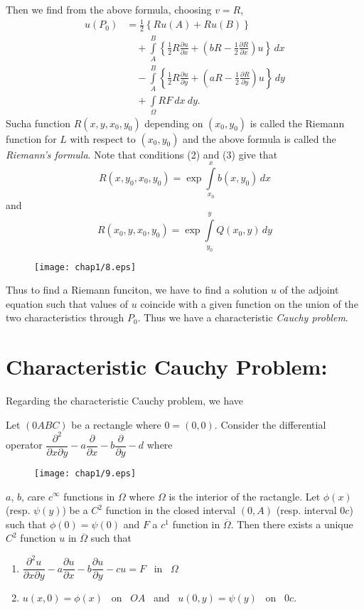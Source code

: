 Then we find from the above formula, choosing $v=R$,
\begin{align*}
u(P_{0}) &= \frac{1}{2}\left\{Ru(A)+Ru(B)\right\}\\[3pt]
         &\quad + \int\limits^{B}_{A}\left\{\frac{1}{2}R\frac{\partial u}{\partial x}+\left(bR-\frac{1}{2}\frac{\partial R}{\partial x}\right)u\right\}\,dx\\[3pt]
&\quad - \int\limits^{B}_{A}\left\{\frac{1}{2}R\frac{\partial u}{\partial y}+\left(aR-\frac{1}{2}\frac{\partial R}{\partial y}\right)u\right\}\,dy\\[3pt]
&\quad + \int\limits_{\Omega} RF \ dx \ dy.
\end{align*}
Such\pageoriginale a function $R(x,y,x_{0},y_{0})$ depending on $(x_{0},y_{0})$ is called the Riemann function for $L$ with respect to $(x_{0},y_{0})$ and the above formula is called the {\em Riemann's formula}. Note that conditions (2) and (3) give that
$$
R(x,y_{0},x_{0},y_{0})=\exp \int\limits^{x}_{x_{0}}b(x,y_{0})\,dx
$$
and
$$
R(x_{0},y,x_{0},y_{0})=\exp \int\limits^{y}_{y_{0}}Q(x_{0},y)\,dy
$$
\begin{figure}[H]
\centering
\texttt{[image: chap1/8.eps]}
\end{figure}
\noindent
Thus to find a Riemann funciton, we have to find a solution $u$ of the adjoint equation such that values of $u$ coincide with a given function on the union of the two characteristics through $P_{0}$. Thus we have a characteristic {\em Cauchy problem}.

\section*{Characteristic Cauchy Problem:}

Regarding the characteristic Cauchy problem, we have

\begin{theorem*}
Let $(0ABC)$ be a rectangle where $0=(0,0)$. Consider the differential operator $\dfrac{\partial^{2}}{\partial x\partial y}-a\dfrac{\partial}{\partial x}-b\dfrac{\partial}{\partial y}-d$ where
\begin{figure}[H]
\centering
\texttt{[image: chap1/9.eps]}
\end{figure}
\noindent
$a$, $b$, $c$\pageoriginale are $c^{\infty}$ functions in $\Omega$ where $\Omega$ is the interior of the ractangle. Let $\phi(x)$ (resp. $\psi(y)$) be a $C^{2}$ function in the closed interval $(0,A)$ (resp. interval $0c$) such that $\phi(0)=\psi(0)$ and $F$ a $c^{1}$ function in $\overline{\Omega}$. Then there exists a unique $C^{2}$ function $u$ in $\overline{\Omega}$ such that
\begin{enumerate}
\renewcommand{\labelenumi}{\rm(\theenumi)}
\item $\dfrac{\partial^{2}u}{\partial x\partial y}-a\dfrac{\partial u}{\partial x}-b\dfrac{\partial u}{\partial y}-cu=F$ \ in \ $\Omega$

\item $u(x,0)=\phi(x)$ \ on \ $OA$ \ and \ $u(0,y)=\psi(y)$ \ on \ $0c$.
\end{enumerate}
\end{theorem*}

